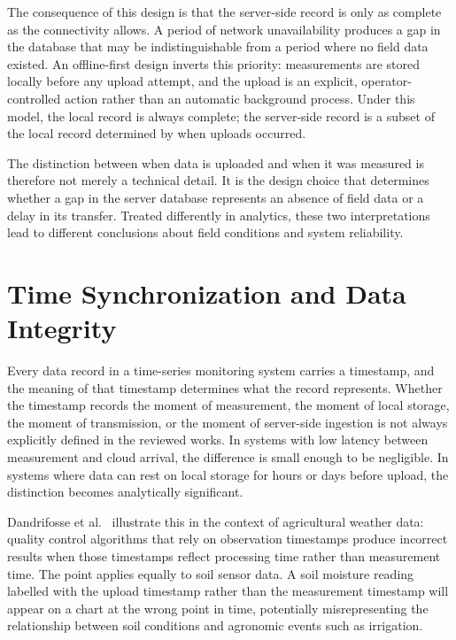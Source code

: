 The consequence of this design is that the server-side record is only as
complete as the connectivity allows. A period of network unavailability
produces a gap in the database that may be indistinguishable from a period
where no field data existed. An offline-first design inverts this priority:
measurements are stored locally before any upload attempt, and the upload
is an explicit, operator-controlled action rather than an automatic background
process. Under this model, the local record is always complete; the server-side
record is a subset of the local record determined by when uploads occurred.

The distinction between when data is uploaded and when it was measured is
therefore not merely a technical detail. It is the design choice that
determines whether a gap in the server database represents an absence of
field data or a delay in its transfer. Treated differently in analytics, these
two interpretations lead to different conclusions about field conditions and
system reliability.

\section{Time Synchronization and Data Integrity}
\label{sec:time-sync}

Every data record in a time-series monitoring system carries a timestamp, and
the meaning of that timestamp determines what the record represents. Whether
the timestamp records the moment of measurement, the moment of local storage,
the moment of transmission, or the moment of server-side ingestion is not
always explicitly defined in the reviewed works. In systems with low latency
between measurement and cloud arrival, the difference is small enough to be
negligible. In systems where data can rest on local storage for hours or days
before upload, the distinction becomes analytically significant.

Dandrifosse et al.~\cite{dandrifosse2024weather_qc_agriculture} illustrate
this in the context of agricultural weather data: quality control algorithms
that rely on observation timestamps produce incorrect results when those
timestamps reflect processing time rather than measurement time. The point
applies equally to soil sensor data. A soil moisture reading labelled with the
upload timestamp rather than the measurement timestamp will appear on a chart
at the wrong point in time, potentially misrepresenting the relationship
between soil conditions and agronomic events such as irrigation.

